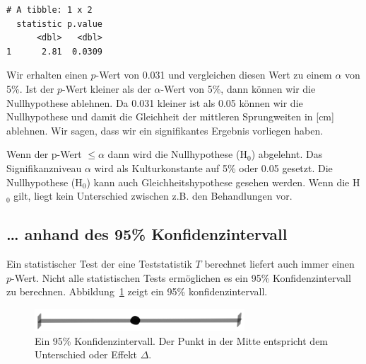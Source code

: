 \documentclass[
  letterpaper,
]{scrbook}
\begin{document}
\begin{verbatim}
# A tibble: 1 x 2
  statistic p.value
      <dbl>   <dbl>
1      2.81  0.0309
\end{verbatim}

{}

Wir erhalten einen \(p\)-Wert von 0.031 und vergleichen diesen Wert zu
einem \(\alpha\) von 5\%. Ist der \(p\)-Wert kleiner als der
\(\alpha\)-Wert von 5\%, dann können wir die Nullhypothese ablehnen. Da
0.031 kleiner ist als 0.05 können wir die Nullhypothese und damit die
Gleichheit der mittleren Sprungweiten in {[}cm{]} ablehnen. Wir sagen,
dass wir ein signifikantes Ergebnis vorliegen haben.

\begin{tcolorbox}[enhanced jigsaw, coltitle=black, titlerule=0mm, bottomrule=.15mm, opacityback=0, opacitybacktitle=0.6, leftrule=.75mm, title=\textcolor{quarto-callout-important-color}{\faExclamation}\hspace{0.5em}{Entscheidung mit dem p-Wert}, toprule=.15mm, bottomtitle=1mm, toptitle=1mm, left=2mm, breakable, arc=.35mm, colback=white, rightrule=.15mm, colbacktitle=quarto-callout-important-color!10!white, colframe=quarto-callout-important-color-frame]
Wenn der p-Wert \(\leq \alpha\) dann wird die Nullhypothese (H\(_0\))
abgelehnt. Das Signifikanzniveau \(\alpha\) wird als Kulturkonstante auf
5\% oder 0.05 gesetzt. Die Nullhypothese (H\(_0\)) kann auch
Gleichheitshypothese gesehen werden. Wenn die H\(_0\) gilt, liegt kein
Unterschied zwischen z.B. den Behandlungen vor.
\end{tcolorbox}

\hypertarget{sec-ki}{%
\subsection{\ldots{} anhand des 95\% Konfidenzintervall}\label{sec-ki}}

Ein statistischer Test der eine Teststatistik \(T\) berechnet liefert
auch immer einen \(p\)-Wert. Nicht alle statistischen Tests ermöglichen
es ein 95\% Konfidenzintervall zu berechnen. Abbildung~\ref{fig-ki-00}
zeigt ein 95\% konfidenzintervall.

\begin{figure}

{\centering \includegraphics[width=0.7\textwidth,height=\textheight]{./images/ci-00.png}

}

\caption{\label{fig-ki-00}Ein 95\% Konfidenzintervall. Der Punkt in der
Mitte entspricht dem Unterschied oder Effekt \(\Delta\).}

\end{figure}
\end{document}

